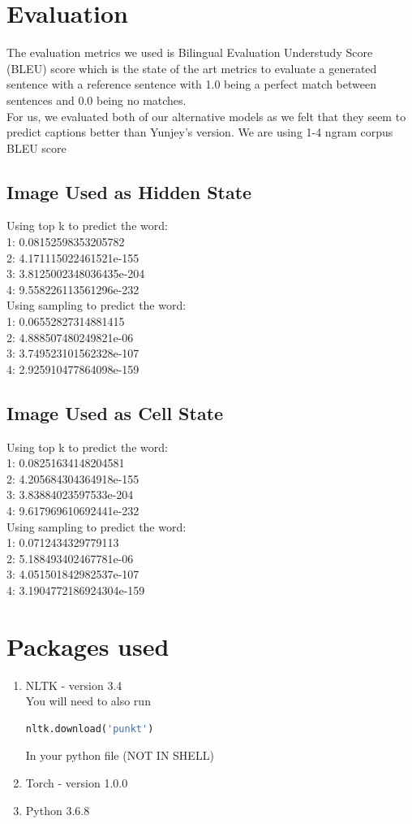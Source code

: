 \documentclass{proc}
\begin{document}
\section{Evaluation}
The evaluation metrics we used is Bilingual Evaluation Understudy Score (BLEU) score which is the state of the art metrics to evaluate a generated sentence with a reference sentence with 1.0 being a perfect match between sentences and 0.0 being no matches.\\
For us, we evaluated both of our alternative models as we felt that they seem to predict captions better than Yunjey's version. We are using 1-4 ngram corpus BLEU score\\
\subsection{Image Used as Hidden State}
Using top k to predict the word:\\
1: 0.08152598353205782\\
2: 4.171115022461521e-155\\
3: 3.8125002348036435e-204\\
4: 9.558226113561296e-232\\
Using sampling to predict the word:\\
1: 0.06552827314881415\\
2: 4.888507480249821e-06\\
3: 3.749523101562328e-107\\
4: 2.925910477864098e-159
\subsection{Image Used as Cell State}
Using top k to predict the word:\\
1: 0.08251634148204581\\
2: 4.205684304364918e-155\\
3: 3.83884023597533e-204\\
4: 9.617969610692441e-232\\
Using sampling to predict the word:\\
1: 0.0712434329779113\\
2: 5.188493402467781e-06\\
3: 4.051501842982537e-107\\
4: 3.1904772186924304e-159

\section{Packages used}
\begin{enumerate}
\item NLTK - version 3.4 \\
You will need to also run 
\begin{lstlisting}[language=python]
nltk.download('punkt')
\end{lstlisting}
In your python file (NOT IN SHELL)
\item Torch - version 1.0.0
\item Python 3.6.8
\end{enumerate}
\end{document}
